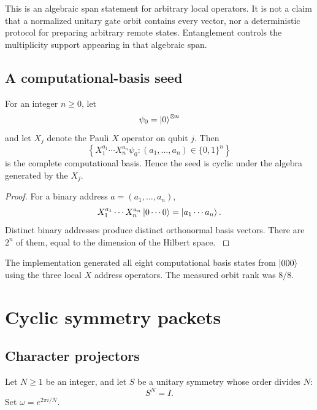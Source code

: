 This is an algebraic span statement for arbitrary local operators. It is not a claim that a normalized unitary gate orbit contains every vector, nor a deterministic protocol for preparing arbitrary remote states. Entanglement controls the multiplicity support appearing in that algebraic span.

\subsection{A computational-basis seed}

\begin{theorem}\label{core:theorem:003}\label{core:thm:computational}
For an integer $n\ge0$, let
\[
\psi_0=\left|0\right\rangle^{\otimes n}
\]
and let $X_j$ denote the Pauli $X$ operator on qubit $j$. Then
\[
\left\{
X_1^{a_1}\cdots X_n^{a_n}\psi_0:
(a_1,\ldots,a_n)\in\{0,1\}^n
\right\}
\]
is the complete computational basis. Hence the seed is cyclic under the algebra generated by the $X_j$.
\end{theorem}

\begin{proof}\label{core:proof:004}
For a binary address $a=(a_1,\ldots,a_n)$,
\[
X_1^{a_1}\cdots X_n^{a_n}\left|0\cdots0\right\rangle
=
\left|a_1\cdots a_n\right\rangle.
\]
Distinct binary addresses produce distinct orthonormal basis vectors. There are $2^n$ of them, equal to the dimension of the Hilbert space.
\label{core:proof:004:end}\end{proof}

\begin{certificate}\label{core:certificate:001}
The implementation generated all eight computational basis states from $\left|000\right\rangle$ using the three local $X$ address operators. The measured orbit rank was $8/8$.
\end{certificate}

\section{Cyclic symmetry packets}\label{core:section:003}

\subsection{Character projectors}

Let $N\ge1$ be an integer, and let $S$ be a unitary symmetry whose order divides $N$:
\[
S^N=I.
\]
Set $\omega=e^{2\pi i/N}$.

